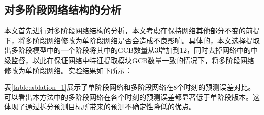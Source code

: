 \subsection{对多阶段网络结构的分析}
本文首先进行对多阶段网络结构的分析，本文考虑在保持网络其他部分不变的前提下，将多阶段网络修改为单阶段网络是否会造成不良影响。具体的，本文选择提取出多阶段模型中的一个阶段将其中的GCB数量从3增加到12，同时去掉网络中的中级监督，以此在保证网络中特征提取模块GCB数量一致的情况下，将多阶段网络修改为单阶段网络。实验结果如下所示：

\begin{table}[h]
    \begin{center}
    \end{center}
    \caption{单阶段网络与多阶段网络对比}
    \label{table:ablation_1}
    \end{table}

表\ref{table:ablation_1}展示了单阶段网络和多阶段网络在8个时刻的预测误差对比。可以看出本方法中的多阶段网络在各个时刻的预测误差都显著低于单阶段版本。这体现了通过拆分预测目标所带来的预测不确定性降低的优点。

